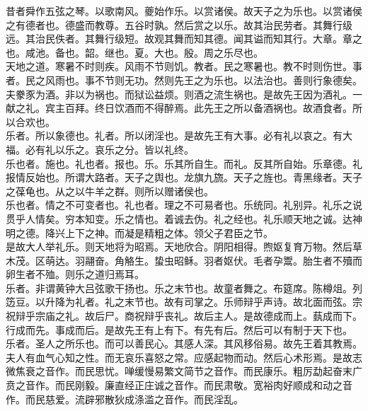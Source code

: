 \documentclass{zhvt-classic}
\begin{document}
\hspace*{2em}昔者舜作五弦之琴。以歌南风。夔始作乐。以赏诸侯。故天子之为乐也。以赏诸侯之有德者也。德盛而教尊。五谷时孰。然后赏之以乐。故其治民劳者。其舞行级远。其治民佚者。其舞行级短。故观其舞而知其德。闻其谥而知其行。大章。章之也。咸池。备也。韶。继也。夏。大也。殷。周之乐尽也。\\
\hspace*{2em}天地之道。寒暑不时则疾。风雨不节则饥。教者。民之寒暑也。教不时则伤世。事者。民之风雨也。事不节则无功。然则先王之为乐也。以法治也。善则行象德矣。夫豢豕为酒。非以为祸也。而狱讼益烦。则酒之流生祸也。是故先王因为酒礼。一献之礼。宾主百拜。终日饮酒而不得醉焉。此先王之所以备酒祸也。故酒食者。所以合欢也。\\
\hspace*{2em}乐者。所以象德也。礼者。所以闭淫也。是故先王有大事。必有礼以哀之。有大福。必有礼以乐之。哀乐之分。皆以礼终。\\
\hspace*{2em}乐也者。施也。礼也者。报也。乐。乐其所自生。而礼。反其所自始。乐章德。礼报情反始也。所谓大路者。天子之舆也。龙旗九旒。天子之旌也。青黑缘者。天子之葆龟也。从之以牛羊之群。则所以赠诸侯也。\\
\hspace*{2em}乐也者。情之不可变者也。礼也者。理之不可易者也。乐统同。礼别异。礼乐之说贯乎人情矣。穷本知变。乐之情也。着诚去伪。礼之经也。礼乐顺天地之诚。达神明之德。降兴上下之神。而凝是精粗之体。领父子君臣之节。\\
\hspace*{2em}是故大人举礼乐。则天地将为昭焉。天地欣合。阴阳相得。煦妪复育万物。然后草木茂。区萌达。羽翮奋。角觡生。蛰虫昭稣。羽者妪伏。毛者孕鬻。胎生者不殰而卵生者不殈。则乐之道归焉耳。\\
\hspace*{2em}乐者。非谓黄钟大吕弦歌干扬也。乐之末节也。故童者舞之。布筵席。陈樽俎。列笾豆。以升降为礼者。礼之末节也。故有司掌之。乐师辩乎声诗。故北面而弦。宗祝辩乎宗庙之礼。故后尸。商祝辩乎丧礼。故后主人。是故德成而上。蓺成而下。行成而先。事成而后。是故先王有上有下。有先有后。然后可以有制于天下也。\\
\hspace*{2em}乐者。圣人之所乐也。而可以善民心。其感人深。其风移俗易。故先王着其教焉。\\
\hspace*{2em}夫人有血气心知之性。而无哀乐喜怒之常。应感起物而动。然后心术形焉。是故志微焦衰之音作。而民思忧。啴缓慢易繁文简节之音作。而民康乐。粗厉勐起奋末广贲之音作。而民刚毅。廉直经正庄诚之音作。而民肃敬。宽裕肉好顺成和动之音作。而民慈爱。流辟邪散狄成涤滥之音作。而民淫乱。\\
\end{document}
